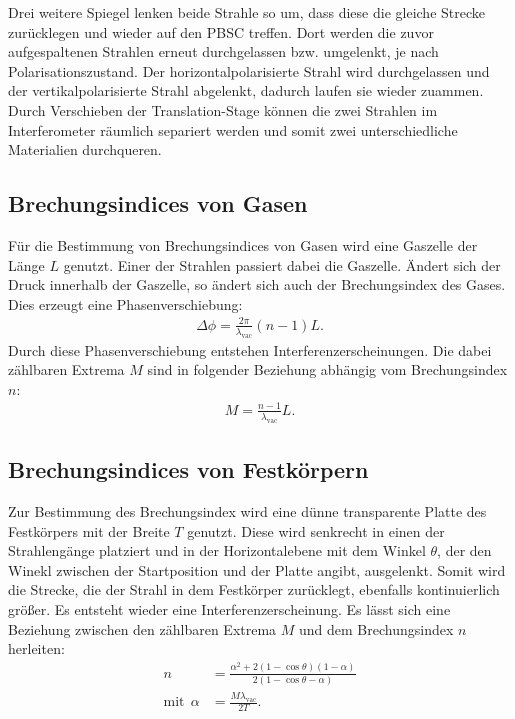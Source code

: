 Drei weitere Spiegel lenken beide Strahle so um, dass diese die gleiche Strecke zurücklegen und wieder auf
den PBSC treffen.
Dort werden die zuvor aufgespaltenen Strahlen erneut durchgelassen bzw. umgelenkt, je nach Polarisationszustand.
Der horizontalpolarisierte Strahl wird durchgelassen und der vertikalpolarisierte Strahl abgelenkt, dadurch laufen sie
wieder zuammen.
Durch Verschieben der Translation-Stage können die zwei Strahlen im Interferometer räumlich separiert
werden und somit zwei unterschiedliche Materialien durchqueren.

\FloatBarrier

\subsection{Brechungsindices von Gasen}
Für die Bestimmung von Brechungsindices von Gasen wird eine Gaszelle
der Länge $L$ genutzt. Einer der Strahlen passiert dabei die Gaszelle.
Ändert sich der Druck innerhalb der Gaszelle, so ändert sich auch
der Brechungsindex des Gases. Dies erzeugt eine Phasenverschiebung:
\begin{align}
  \Delta\phi=\frac{2\pi}{\lambda_\mathrm{vac}}(n-1)L.
\end{align}
Durch diese Phasenverschiebung entstehen Interferenzerscheinungen.
Die dabei zählbaren Extrema $M$ sind in folgender Beziehung abhängig
vom Brechungsindex $n$:
\begin{align}
  M=\frac{n-1}{\lambda_\mathrm{vac}}L\label{eqn:gas}.
\end{align}

\subsection{Brechungsindices von Festkörpern}
Zur Bestimmung des Brechungsindex wird eine dünne transparente
Platte des Festkörpers mit der Breite $T$ genutzt. Diese wird senkrecht in einen der Strahlengänge
platziert und in der Horizontalebene mit dem  Winkel $\theta$, der den Winekl zwischen der Startposition und der Platte angibt, ausgelenkt. Somit wird die
Strecke, die der Strahl in dem Festkörper zurücklegt, ebenfalls kontinuierlich größer.
Es entsteht wieder eine Interferenzerscheinung.
Es lässt sich eine Beziehung zwischen den zählbaren Extrema $M$
und dem Brechungsindex $n$ herleiten:
\begin{align}%
  n&=\frac{\alpha^2+2(1-\cos\theta)(1-\alpha)}{2(1-\cos\theta-\alpha)}\\
  \text{mit} \ \ \alpha&= \frac{M\lambda_\mathrm{vac}}{2T}. \label{eqn:glas}
\end{align}
